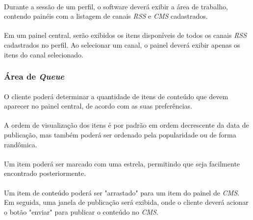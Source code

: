 \documentclass[a4paper,12pt]{article}
\def\cms{\emph{CMS}}
\def\rss{\emph{RSS}}
\begin{document}

\paragraph{}
Durante a sessão de um perfil, o software deverá exibir a área de trabalho,
contendo painéis com a listagem de canais \rss{} e \cms{} cadastrados.

\paragraph{}
Em um painel central, serão exibidos os itens disponíveis de todos os canais
\rss{} cadastrados no perfil. Ao selecionar um canal, o painel deverá exibir
apenas os itens do canal selecionado.

\subsubsection{Área de \emph{Queue}}

\paragraph{}
O cliente poderá determinar a quantidade de itens de conteúdo que devem
aparecer no painel central, de acordo com as suas preferências.

\paragraph{}
A ordem de visualização dos itens é por padrão em ordem decrescente da data de
publicação, mas também poderá ser ordenado pela popularidade ou de forma
randômica.

\paragraph{}
Um item poderá ser marcado com uma estrela, permitindo que seja facilmente
encontrado posteriormente.

\paragraph{}
Um item de conteúdo poderá ser "arrastado" para um item do painel de \cms{}. Em
seguida, uma janela de publicação será exibida, onde o cliente deverá acionar o
botão "enviar" para publicar o conteúdo no \cms{}.
\end{document}
